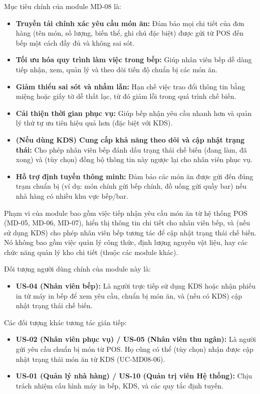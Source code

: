 \label{sssec:md08_objectives_scope}
Mục tiêu chính của module MD-08 là:
\begin{itemize}
    \item \textbf{Truyền tải chính xác yêu cầu món ăn:} Đảm bảo mọi chi tiết của đơn hàng (tên món, số lượng, biến thể, ghi chú đặc biệt) được gửi từ POS đến bếp một cách đầy đủ và không sai sót.
    \item \textbf{Tối ưu hóa quy trình làm việc trong bếp:} Giúp nhân viên bếp dễ dàng tiếp nhận, xem, quản lý và theo dõi tiến độ chuẩn bị các món ăn.
    \item \textbf{Giảm thiểu sai sót và nhầm lẫn:} Hạn chế việc trao đổi thông tin bằng miệng hoặc giấy tờ dễ thất lạc, từ đó giảm lỗi trong quá trình chế biến.
    \item \textbf{Cải thiện thời gian phục vụ:} Giúp bếp nhận yêu cầu nhanh hơn và quản lý thứ tự ưu tiên hiệu quả hơn (đặc biệt với KDS).
    \item \textbf{(Nếu dùng KDS) Cung cấp khả năng theo dõi và cập nhật trạng thái:} Cho phép nhân viên bếp đánh dấu trạng thái chế biến (đang làm, đã xong) và (tùy chọn) đồng bộ thông tin này ngược lại cho nhân viên phục vụ.
    \item \textbf{Hỗ trợ định tuyến thông minh:} Đảm bảo các món ăn được gửi đến đúng trạm chuẩn bị (ví dụ: món chính gửi bếp chính, đồ uống gửi quầy bar) nếu nhà hàng có nhiều khu vực bếp/bar.
\end{itemize}
Phạm vi của module bao gồm việc tiếp nhận yêu cầu món ăn từ hệ thống POS (MD-05, MD-06, MD-07), hiển thị thông tin chi tiết cho nhân viên bếp, và (nếu sử dụng KDS) cho phép nhân viên bếp tương tác để cập nhật trạng thái chế biến. Nó không bao gồm việc quản lý công thức, định lượng nguyên vật liệu, hay các chức năng quản lý kho chi tiết (thuộc các module khác).

\label{sssec:md08_primary_users}
Đối tượng người dùng chính của module này là:
\begin{itemize}
    \item \textbf{US-04 (Nhân viên bếp):} Là người trực tiếp sử dụng KDS hoặc nhận phiếu in từ máy in bếp để xem yêu cầu, chuẩn bị món ăn, và (nếu có KDS) cập nhật trạng thái chế biến.
\end{itemize}
Các đối tượng khác tương tác gián tiếp:
\begin{itemize}
    \item \textbf{US-02 (Nhân viên phục vụ) / US-05 (Nhân viên thu ngân):} Là người gửi yêu cầu chuẩn bị món từ POS. Họ cũng có thể (tùy chọn) nhận được cập nhật trạng thái món ăn từ KDS (UC-MD08-06).
    \item \textbf{US-01 (Quản lý nhà hàng) / US-10 (Quản trị viên Hệ thống):} Chịu trách nhiệm cấu hình máy in bếp, KDS, và các quy tắc định tuyến.
\end{itemize}

